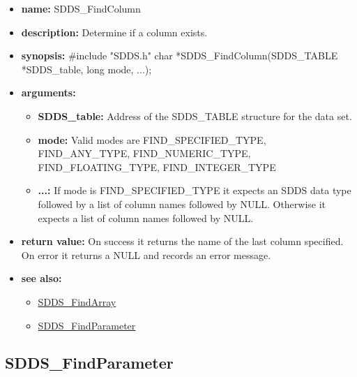 \documentclass[11pt]{article}
\newcommand{\progref}[1]{\hyperref{SDDS_#1}{{\tt SDDS\_#1} (}{)}{SDDS_#1}}
\begin{document}
\begin{itemize}
\item {\bf name:}\newline
SDDS\_FindColumn
\item {\bf description:}\newline
Determine if a column exists.
\item {\bf synopsis:} \#include "SDDS.h"\newline
char *SDDS\_FindColumn(SDDS\_TABLE *SDDS\_table, long mode, ...);
\item {\bf arguments:}
\begin{itemize}
\item {\bf SDDS\_table:} Address of the SDDS\_TABLE structure for the data set.
\item {\bf mode:} Valid modes are FIND\_SPECIFIED\_TYPE, FIND\_ANY\_TYPE, FIND\_NUMERIC\_TYPE, FIND\_FLOATING\_TYPE, FIND\_INTEGER\_TYPE
\item {\bf ...:} If mode is FIND\_SPECIFIED\_TYPE it expects an SDDS data type followed by a list of column names followed by NULL. Otherwise it expects a list of column names followed by NULL.
\end{itemize}
\item {\bf return value:}\newline
On success it returns the name of the last column specified. On error it returns a NULL and records an error message.
\item {\bf see also:}
\begin{itemize}
\item \progref{FindArray}
\item \progref{FindParameter}
\end{itemize}
\end{itemize}

\subsection{SDDS\_FindParameter}
\label{SDDS_FindParameter}
\end{document}
